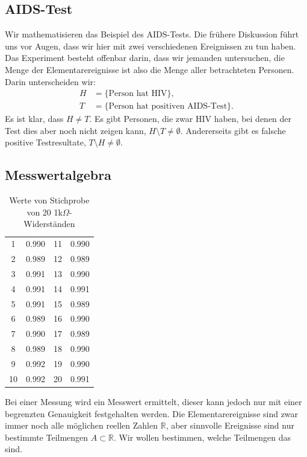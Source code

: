 \subsection{AIDS-Test}
Wir mathematisieren das Beispiel des AIDS-Tests.
Die frühere Diskussion führt uns vor Augen,
dass wir hier mit zwei verschiedenen Ereignissen zu tun haben. 
Das Experiment besteht offenbar darin, dass wir jemanden untersuchen,
die Menge der Elementarereignisse ist also die Menge aller betrachteten
Personen.
Darin unterscheiden wir:
\begin{align*}
H&=\{\text{Person hat HIV}\},\\
T&=\{\text{Person hat positiven AIDS-Test}\}.
\end{align*}
Es ist klar, dass $H\ne T$.
Es gibt Personen, die zwar HIV haben, bei
denen der Test dies aber noch nicht zeigen kann, $H\setminus T\ne \emptyset$.
Andererseits gibt es falsche positive Testresultate,
$T\setminus H\ne\emptyset$. 

\subsection{Messwertalgebra}
\begin{table}
\begin{center}
\begin{tabular}{|cc|cc|}
\hline
1&0.990
&11&0.990\\
2&0.989
&12&0.989\\
3&0.991
&13&0.990\\
4&0.991
&14&0.991\\
5&0.991
&15&0.989\\
6&0.989
&16&0.990\\
7&0.990
&17&0.989\\
8&0.989
&18&0.990\\
9&0.992
&19&0.990\\
10&0.992
&20&0.991\\
\hline
\end{tabular}
\end{center}
\caption{Werte von Stichprobe von 20 1k$\Omega$-Widerständen\label{widerstandswerte}}
\end{table}
Bei einer Messung wird ein Messwert ermittelt, dieser kann jedoch
nur mit einer begrenzten Genauigkeit festgehalten werden.
Die Elementarereignisse sind zwar immer noch alle möglichen reellen
Zahlen $\mathbb R$, aber sinnvolle Ereignisse sind nur bestimmte Teilmengen
$A\subset\mathbb R$.
Wir wollen bestimmen, welche Teilmengen das sind.

